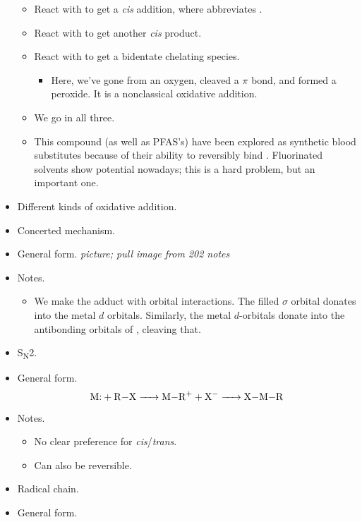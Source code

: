 \documentclass[../notes.tex]{subfiles}
\begin{document}
\begin{itemize}
\begin{itemize}
        \item React with  to get a \emph{cis} addition, where  abbreviates .
        \item React with  to get another \emph{cis} product.
        \item React with  to get a bidentate chelating species.
        \begin{itemize}
            \item Here, we've gone from an oxygen, cleaved a $\pi$ bond, and formed a peroxide. It is a nonclassical oxidative addition.
        \end{itemize}
        \item We go  in all three.
        \item This compound (as well as PFAS's) have been explored as synthetic blood substitutes because of their ability to reversibly bind . Fluorinated solvents show potential nowadays; this is a hard problem, but an important one.
    \end{itemize}
    \item Different kinds of oxidative addition.
    \item Concerted mechanism.
    \item General form.
    \emph{picture; pull image from 202 notes}
    \item Notes.
    \begin{itemize}
        \item We make the adduct with orbital interactions. The filled $\sigma$ orbital donates into the metal $d$ orbitals. Similarly, the metal $d$-orbitals donate into the antibonding orbitals of , cleaving that.
    \end{itemize}
    \item S\textsubscript{N}2.
    \item General form.
    \begin{equation*}
        \ce{M$:$ + R-X -> M-R^+ + X- -> X-M-R}
    \end{equation*}
    \item Notes.
    \begin{itemize}
        \item No clear preference for \emph{cis}/\emph{trans}.
        \item Can also be reversible.
    \end{itemize}
    \item Radical chain.
    \item General form.
    \begin{equation*}

\end{equation*}
\end{itemize}
\end{document}

